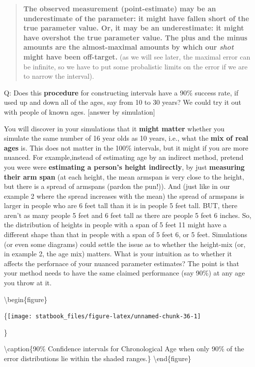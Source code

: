 \documentclass[]{book}
\begin{document}
\begin{quote}
\textbf{The observed measurement (point-estimate) may be an underestimate of the parameter: it might have fallen short of the true parameter value. Or, it may be an underestimate: it might have overshot the true parameter value. The plus and the minus amounts are the almost-maximal amounts by which our \emph{shot} might have been off-target.} (as we will see later, the maximal error can be infinite, so we have to put some probalistic limits on the error if we are to narrow the interval).
\end{quote}

Q: Does this \textbf{procedure} for constructing intervals have a 90\% success rate, if used up and down all of the ages, say from 10 to 30 years? We could try it out with people of known ages. {[}answer by simulation{]}

You will discover in your simulations that it \textbf{might matter} whether you simulate the same number of 16 year olds as 10 years, i.e., what the \textbf{mix of real ages} is. This does not matter in the 100\% intervals, but it might if you are more nuanced. For example,instead of estimating age by an indirect method, pretend you were were \textbf{estimating a person's height indirectly}, by just \textbf{measuring their arm span} (at each height, the mean armspan is very close to the height, but there is a spread of armspans (pardon the pun!)). And (just like in our example 2 where the spread increases with the mean) the spread of armspans is larger in people who are 6 feet tall than it is in people 5 feet tall.
BUT, there aren't as many people 5 feet and 6 feet tall as there are people 5 feet 6 inches. So, the distribution of heights in people with a span of 5 feet 11 might have a different shape than that in people with a span of 5 feet 6, or 5 feet. Simulations (or even some diagrams) could settle the issue as to whether the height-mix (or, in example 2, the age mix) matters. What is your intuition as to whether it affects the perfornace of your nuanced parameter estimates? The point is that your method needs to have the same claimed performance (say 90\%) at any age you throw at it.

\textbackslash{}begin\{figure\}

\{\centering \texttt{[image: statbook\_files/figure-latex/unnamed-chunk-36-1]}

\}

\textbackslash{}caption\{90\% Confidence intervals for Chronological Age when only 90\% of the error distributions lie within the shaded ranges.\}\label{fig:unnamed-chunk-36}
\textbackslash{}end\{figure\}
\end{document}
